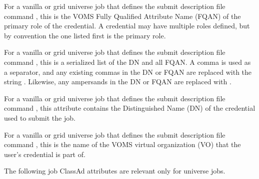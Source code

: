 \begin{description}
\item[\AdAttr{X509UserProxyFirstFQAN}:]   
For a vanilla or grid universe job that defines the submit description
file command , 
this is the VOMS Fully Qualified Attribute Name (FQAN) of
the primary role of the credential. 
A credential may have multiple roles defined, 
but by convention the one listed first is the primary role. 

\item[\AdAttr{X509UserProxyFQAN}:]   
For a vanilla or grid universe job that defines the submit description
file command , 
this is a serialized list of the DN and all FQAN.
A comma is used as a separator,
and any existing commas in the DN or FQAN are replaced with the string
.
Likewise, any ampersands in the DN or FQAN are replaced with
.

\item[\AdAttr{X509UserProxySubject}:]   
For a vanilla or grid universe job that defines the submit description
file command , 
this attribute contains the Distinguished Name (DN) of the credential
used to submit the job.

\item[\AdAttr{X509UserProxyVOName}:]   
For a vanilla or grid universe job that defines the submit description
file command , 
this is the name of the VOMS virtual organization (VO) that 
the user's credential is part of. 

\end{description}

The following job ClassAd attributes are relevant only for
 universe jobs.

